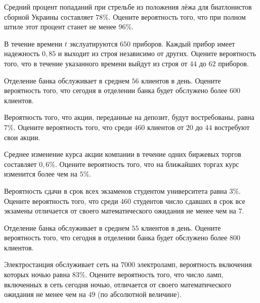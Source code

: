 \vfill

\newpage\setcounter{zad}{0}

\z Средний процент попаданий при стрельбе из положения лёжа для биатлонистов сборной Украины составляет $ 78 \% $. Оцените вероятность того, что при полном штиле этот процент станет не менее $ 96 \% $.


\vfill

\z В течение времени $t$ экслуатируются $ 650 $ приборов. Каждый прибор имеет надежность $ 0{,}85 $ и выходит из строя независимо от других. Оцените вероятность того, что в течение указанного времени выйдут из строя от $ 44 $ до $ 62 $ приборов.
 

\vfill

\newpage\setcounter{zad}{0}

\z Отделение банка обслуживает в среднем $ 56 $ клиентов в день. Оцените вероятность того, что сегодня в отделении банка будет обслужено более $ 600 $ клиентов.


\vfill

\z Вероятность того, что акции, переданные на депозит, будут востребованы, равна $ 7 \% $. Оцените вероятность того, что среди $ 460 $ клиентов от $ 20 $ до $ 44 $ востребуют свои акции.
 

\vfill

\newpage\setcounter{zad}{0}

\z Среднее изменение курса акции компании в течение одних биржевых торгов составляет $ 0{,}6 \% $. Оцените вероятность того, что на ближайших торгах курс изменится более чем на $ 5 \% $.


\vfill

\z Вероятность сдачи в срок всех экзаменов студентом университета равна $ 3 \% $. Оцените вероятность того, что среди $ 460 $ студентов число сдавших в срок все экзамены отличается от своего математического ожидания не менее чем на $ 7 $. 
 

\vfill

\newpage\setcounter{zad}{0}

\z Отделение банка обслуживает в среднем $ 55 $ клиентов в день. Оцените вероятность того, что сегодня в отделении банка будет обслужено более $ 800 $ клиентов.


\vfill

\z Электростанция обслуживает сеть на $ 7000 $ электроламп, вероятность включения которых ночью равна $ 83 \% $. Оцените вероятность того, что число ламп, включенных в сеть сегодня ночью, отличается от своего математического ожидания не менее чем на $ 49 $ (по абсолютной величине). 
 

